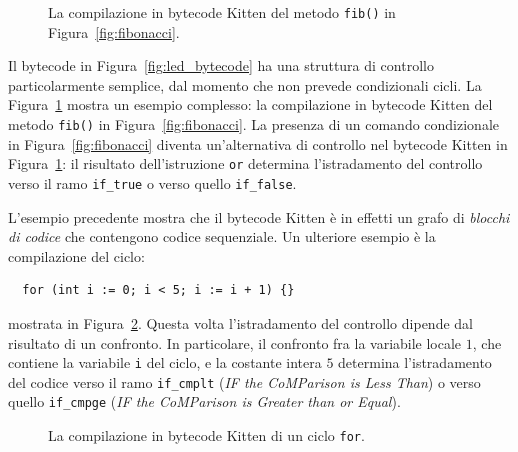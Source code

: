 \begin{figure}[t]
\begin{center}
\end{center}
\caption{La compilazione in bytecode Kitten del metodo \texttt{fib()} in Figura~\ref{fig:fibonacci}.}\label{fig:fib_bytecode}
\end{figure}
%
Il bytecode in Figura~\ref{fig:led_bytecode} ha una struttura di controllo
particolarmente semplice, dal momento che non prevede condizionali \nec cicli.
La Figura~\ref{fig:fib_bytecode} mostra un esempio \piu complesso:
la compilazione in bytecode Kitten del metodo \texttt{fib()} in
Figura~\ref{fig:fibonacci}. La presenza di un comando condizionale in
Figura~\ref{fig:fibonacci} diventa un'alternativa di controllo nel
bytecode Kitten in Figura~\ref{fig:fib_bytecode}: il risultato dell'istruzione
\texttt{or} determina l'istradamento del controllo verso il ramo
\texttt{if\_true} o verso quello \texttt{if\_false}.

L'esempio precedente mostra che il bytecode Kitten \`e in effetti un grafo
di \emph{blocchi di codice} che contengono codice
sequenziale. Un ulteriore esempio \`e la compilazione del ciclo:
%
\begin{verbatim}
  for (int i := 0; i < 5; i := i + 1) {}
\end{verbatim}
%
mostrata in Figura~\ref{fig:cycle_bytecode}. Questa volta
l'istradamento del controllo dipende dal risultato di un confronto.
In particolare, il confronto fra la variabile locale $1$, che contiene
la variabile \texttt{i} del ciclo, e la costante intera $5$ determina
l'istradamento del codice verso il ramo \texttt{if\_cmplt}
(\emph{IF the CoMParison is Less Than}) o verso quello
\texttt{if\_cmpge} (\emph{IF the CoMParison is Greater than or Equal}).
%
\begin{figure}[t]
\begin{center}
\end{center}
\caption{La compilazione in bytecode Kitten di un ciclo \texttt{for}.}\label{fig:cycle_bytecode}
\end{figure}
%
